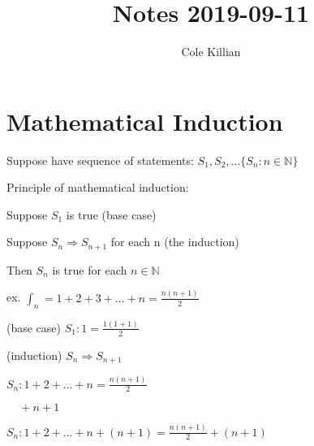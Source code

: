 \documentclass{article}
\begin{document}
\title{Notes 2019-09-11}
\author{Cole Killian}


\section{Mathematical Induction}

Suppose have sequence of statements: $S_1, S_2, \dots \{S_n: n \in \mathbb{N}\}$

Principle of mathematical induction:

Suppose  $S_1$ is true (base case)

Suppose $S_n \Rightarrow S_{n+1}$ for each n (the induction)

Then $S_n$ is true for each $n \in \mathbb{N}$ 

ex. $\int_n = 1 + 2 + 3 + \dots + n = \frac{n(n+1)}{2}$

(base case) $S_1:  1 = \frac{1(1 + 1)}{2}$

(induction) $S_n \Rightarrow S_{n+1}$

$S_n: 1 + 2 + \dots + n = \frac{n(n+1)}{2}$

$\ \ \ \ \ +n + 1$

$S_n: 1 + 2 + \dots + n + (n + 1) = \frac{n(n+1)}{2} + (n + 1)$
\end{document}
